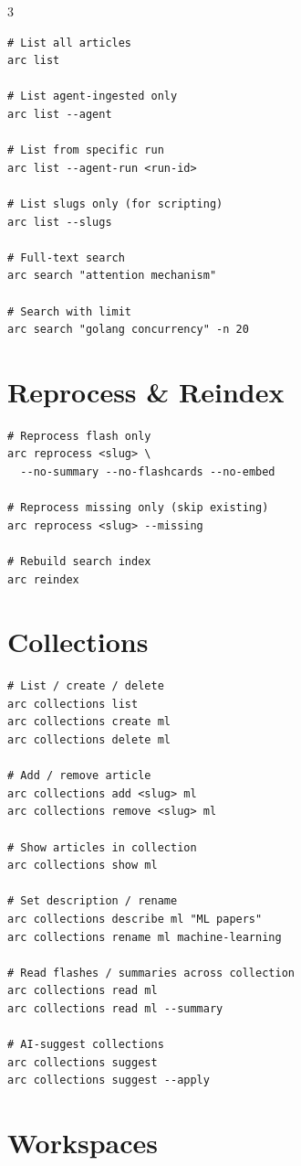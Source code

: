 \documentclass[10pt,a4paper,landscape]{article}
\begin{document}
\begin{multicols}{3}
\begin{lstlisting}
# List all articles
arc list

# List agent-ingested only
arc list --agent

# List from specific run
arc list --agent-run <run-id>

# List slugs only (for scripting)
arc list --slugs

# Full-text search
arc search "attention mechanism"

# Search with limit
arc search "golang concurrency" -n 20
\end{lstlisting}

\section{Reprocess \& Reindex}

\begin{lstlisting}
# Reprocess flash only
arc reprocess <slug> \
  --no-summary --no-flashcards --no-embed

# Reprocess missing only (skip existing)
arc reprocess <slug> --missing

# Rebuild search index
arc reindex
\end{lstlisting}

\section{Collections}

\begin{lstlisting}
# List / create / delete
arc collections list
arc collections create ml
arc collections delete ml

# Add / remove article
arc collections add <slug> ml
arc collections remove <slug> ml

# Show articles in collection
arc collections show ml

# Set description / rename
arc collections describe ml "ML papers"
arc collections rename ml machine-learning

# Read flashes / summaries across collection
arc collections read ml
arc collections read ml --summary

# AI-suggest collections
arc collections suggest
arc collections suggest --apply
\end{lstlisting}

\columnbreak

\section{Workspaces}


\end{multicols}
\end{document}
